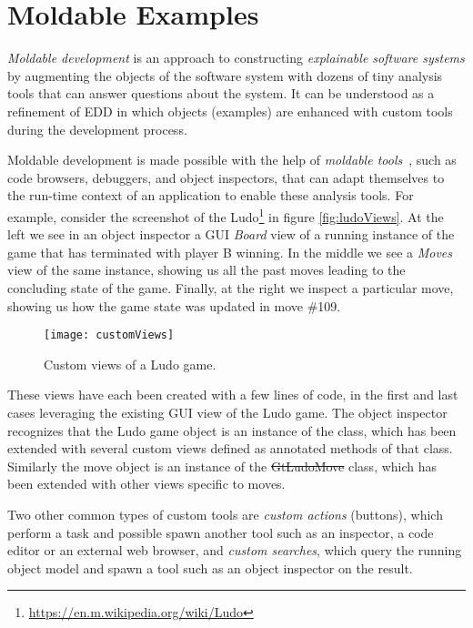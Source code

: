 \documentclass[sigplan,anonymous,review,10pt]{acmart}
\begin{document}
\section{Moldable Examples}\label{sec:moldable}

\emph{Moldable development} is an approach to constructing \emph{explainable software systems} by augmenting the objects of the software system with dozens of tiny analysis tools that can answer questions about the system.
It can be understood as a refinement of EDD in which objects (examples) are enhanced with custom tools during the development process.

Moldable development is made possible with the help of \emph{moldable tools}~\cite{Chis17a}, such as code browsers, debuggers, and object inspectors, that can adapt themselves to the run-time context of an application to enable these analysis tools.
For example, consider the screenshot of the Ludo\footnote{\url{https://en.m.wikipedia.org/wiki/Ludo}} in figure \autoref{fig:ludoViews}.
At the left we see in an object inspector a GUI \emph{Board} view of a running instance of the game that has terminated with player B winning.
In the middle we see a \emph{Moves} view of the same instance, showing us all the past moves leading to the concluding state of the game.
Finally, at the right we inspect a particular move, showing us how the game state was updated in move \#109.

\begin{figure}[h]
  \texttt{[image: customViews]}
  \caption{Custom views of a Ludo game.}
  \label{fig:ludoViews}
\end{figure}

These views have each been created with a few lines of code, in the first and last cases leveraging the existing GUI view of the Ludo game.
The object inspector recognizes that the Ludo game object is an instance of the  class, 
which has been extended with several custom views defined as annotated methods of that class.
Similarly the move object is an instance of the \st{GtLudoMove} class, which has been extended with other views specific to moves.

Two other common types of custom tools are \emph{custom actions} (\eg buttons), which perform a task and possible spawn another tool such as an inspector, a code editor or an external web browser, and \emph{custom searches}, which query the running object model and spawn a tool such as an object inspector on the result.
\end{document}
